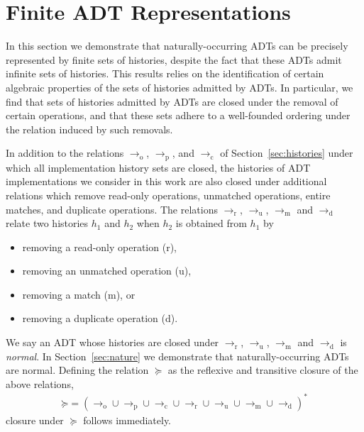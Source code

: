 \section{Finite ADT Representations}
\label{sec:patterns}

In this section we demonstrate that naturally-occurring ADTs can be precisely
represented by finite sets of histories, despite the fact that these ADTs admit
infinite sets of histories. This results relies on the identification of certain
algebraic properties of the sets of histories admitted by ADTs. In particular,
we find that sets of histories admitted by ADTs are closed under the removal
of certain operations, and that these sets adhere to a well-founded ordering
under the relation induced by such removals.

In addition to the relations $\to_\mathrm{o}$, $\to_\mathrm{p}$, and
$\to_\mathrm{c}$ of Section~\ref{sec:histories} under which all implementation
history sets are closed, the histories of ADT implementations we consider in
this work are also closed under additional relations which remove read-only
operations, unmatched operations, entire matches, and duplicate operations. The
relations $\to_\mathrm{r}$, $\to_\mathrm{u}$, $\to_\mathrm{m}$ and
$\to_\mathrm{d}$ relate two histories $h_1$ and $h_2$ when $h_2$ is obtained
from $h_1$ by
\begin{itemize}

  \item removing a read-only operation (r),

  \item removing an unmatched operation (u),

  \item removing a match (m), or

  \item removing a duplicate operation (d).

\end{itemize}
We say an ADT whose histories are closed under $\to_\mathrm{r}$,
$\to_\mathrm{u}$, $\to_\mathrm{m}$ and $\to_\mathrm{d}$ is \emph{normal}. In
Section~\ref{sec:nature} we demonstrate that naturally-occurring ADTs are
normal. Defining the relation $\succeq$ as the reflexive and transitive closure
of the above relations,
\begin{align*}
  \mathord{\succeq} = (
    \to_\mathrm{o} \cup \to_\mathrm{p} \cup \to_\mathrm{c} \cup
    \to_\mathrm{r} \cup \to_\mathrm{u} \cup \to_\mathrm{m} \cup \to_\mathrm{d}
  )^\ast
\end{align*}
closure under $\succeq$ follows immediately.

